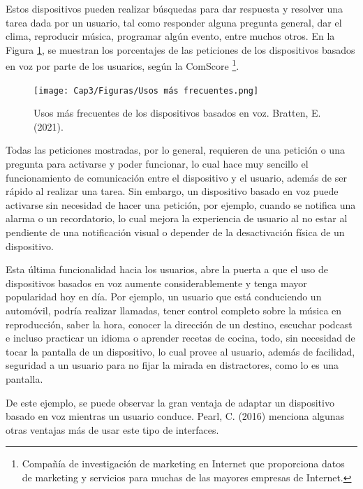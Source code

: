 Estos dispositivos pueden realizar búsquedas para dar respuesta y resolver una tarea dada por un usuario, tal como responder alguna pregunta general, dar el clima, reproducir música, programar algún evento, entre muchos otros. En la Figura \ref{fig:32}, se muestran los porcentajes de las peticiones de los dispositivos basados en voz por parte de los usuarios, según la ComScore \footnote{Compañía de investigación de marketing en Internet que proporciona datos de marketing y servicios para muchas de las mayores empresas de Internet.}.

\begin{figure}[H]
  \centering
  \texttt{[image: Cap3/Figuras/Usos más frecuentes.png]}
  \caption{Usos más frecuentes de los dispositivos basados en voz. Bratten, E. (2021).}
  \label{fig:32}
\end{figure}

Todas las peticiones mostradas, por lo general, requieren de una petición o una pregunta para activarse y poder funcionar, lo cual hace muy sencillo el funcionamiento de comunicación entre el dispositivo y el usuario, además de ser rápido al realizar una tarea. Sin embargo, un dispositivo basado en voz puede activarse sin necesidad de hacer una petición, por ejemplo, cuando se notifica una alarma o un recordatorio, lo cual mejora la experiencia de usuario al no estar al pendiente de una notificación visual o depender de la desactivación física de un dispositivo.

Esta última funcionalidad hacia los usuarios, abre la puerta a que el uso de dispositivos basados en voz aumente considerablemente y tenga mayor popularidad hoy en día. Por ejemplo, un usuario que está conduciendo un automóvil, podría realizar llamadas, tener control completo sobre la música en reproducción, saber la hora, conocer la dirección de un destino, escuchar podcast e incluso practicar un idioma o aprender recetas de cocina, todo, sin necesidad de tocar la pantalla de un dispositivo, lo cual provee al usuario, además de facilidad, seguridad a un usuario para no fijar la mirada en distractores, como lo es una pantalla.

De este ejemplo, se puede observar la gran ventaja de adaptar un dispositivo basado en voz mientras un usuario conduce. Pearl, C. (2016) menciona algunas otras ventajas más de usar este tipo de interfaces.

